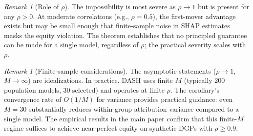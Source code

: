 \documentclass[11pt]{article}
\theoremstyle{remark}
\newtheorem{remark}[theorem]{Remark}
\newcommand{\rhovar}{\rho}                  %
\newcommand{\dash}{\textsc{DASH}}
\begin{document}
\begin{remark}[Role of $\rhovar$]
\label{rem:rho}
The impossibility is most severe as $\rhovar \to 1$ but is present for
any $\rhovar > 0$.  At moderate correlations (e.g., $\rhovar = 0.5$), the
first-mover advantage exists but may be small enough that finite-sample
noise in SHAP estimates masks the equity violation.  The theorem
establishes that no principled guarantee can be made for a single model,
regardless of $\rhovar$; the practical severity scales with $\rhovar$.
\end{remark}

\begin{remark}[Finite-sample considerations]
\label{rem:finite}
The asymptotic statements ($\rhovar \to 1$, $M \to \infty$) are
idealizations.  In practice, \dash{} uses finite $M$ (typically 200
population models, 30 selected) and operates at finite $\rhovar$.
The corollary's convergence rate of $O(1/M)$ for variance provides
practical guidance: even $M = 30$ substantially reduces within-group
attribution variance compared to a single model.  The empirical results
in the main paper confirm that this finite-$M$ regime suffices to achieve
near-perfect equity on synthetic DGPs with $\rhovar \geq 0.9$.
\end{remark}
\end{document}
